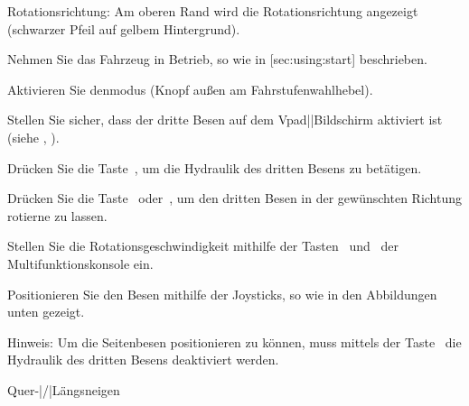 {\md Rotationsrichtung:} {\lt Am oberen Rand wird die Rotationsrichtung angezeigt (schwarzer Pfeil auf gelbem Hintergrund).}
\stopSymVpad

\stopsection






\startsection [title={Mit dem dritten Besen arbeiten (Option)},
							reference={sec:using:frontBrush},
							]

\startSteps
\item Nehmen Sie das Fahrzeug in Betrieb, so wie in [sec:using:start]  beschrieben.
\item Aktivieren Sie denmodus (Knopf außen am Fahrstufenwahlhebel).
\stopSteps


\startSteps [continue]
\item Stellen Sie sicher, dass der dritte Besen auf dem Vpad||Bildschirm aktiviert ist
(siehe  , ).
\item Drücken Sie die Taste~, um die Hydraulik des dritten Besens zu betätigen.
\item Drücken Sie die Taste~ oder~, um den dritten Besen in der gewünschten Richtung rotierne zu lassen.

\item Stellen Sie die Rotationsgeschwindigkeit mithilfe der Tasten~ und~ der Multifunktionskonsole ein.

\item Positionieren Sie den Besen mithilfe der Joysticks, so wie in den Abbildungen unten gezeigt.

\stopSteps

{\md Hinweis:} {\lt Um die Seitenbesen positionieren zu können, muss mittels der Taste~ die Hydraulik des dritten Besens deaktiviert werden.}
\vfill

\start
\setupcombinations [width=\textwidth]

{
{}{Quer-|/|Längsneigen}
\stopcombination}
\stop



